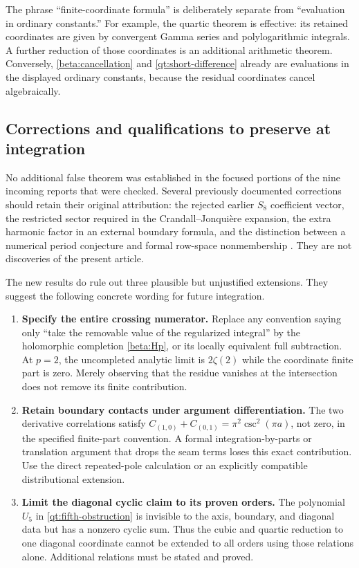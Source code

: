 The phrase ``finite-coordinate formula'' is deliberately separate from
``evaluation in ordinary constants.'' For example, the quartic theorem
is effective: its retained coordinates are given by convergent Gamma
series and polylogarithmic integrals. A further reduction of those
coordinates is an additional arithmetic theorem. Conversely,
\eqref{beta:cancellation} and \eqref{qt:short-difference} already are
evaluations in the displayed ordinary constants, because the residual
coordinates cancel algebraically.

\subsection{Corrections and qualifications to preserve at integration}

No additional false theorem was established in the focused portions of
the nine incoming reports that were checked. Several previously
documented corrections should retain their original attribution: the
rejected earlier $S_8$ coefficient vector, the restricted sector required
in the Crandall--Jonqui\`ere expansion, the extra harmonic factor in an
external boundary formula, and the distinction between a numerical
period conjecture and formal row-space nonmembership
\cite{RepoExact,RepoCubic,RepoIndependent}. They are not discoveries of
the present article.

The new results do rule out three plausible but unjustified extensions.
They suggest the following concrete wording for future integration.
\begin{enumerate}
\item \textbf{Specify the entire crossing numerator.}
Replace any convention saying only ``take the removable value of the
regularized integral'' by the holomorphic completion
\eqref{beta:Hp}, or its locally equivalent full subtraction. At $p=2$,
the uncompleted analytic limit is $2\zeta(2)$ while the coordinate
finite part is zero. Merely observing that the residue vanishes at the
intersection does not remove its finite contribution.
\item \textbf{Retain boundary contacts under argument differentiation.}
The two derivative correlations satisfy
$C_{(1,0)}+C_{(0,1)}=\pi^2\csc^2(\pi a)$, not zero, in the specified
finite-part convention. A formal integration-by-parts or translation
argument that drops the seam terms loses this exact contribution.
Use the direct repeated-pole calculation or an explicitly compatible
distributional extension.
\item \textbf{Limit the diagonal cyclic claim to its proven orders.}
The polynomial $U_5$ in \eqref{qt:fifth-obstruction} is invisible to the
axis, boundary, and diagonal data but has a nonzero cyclic sum. Thus the
cubic and quartic reduction to one diagonal coordinate cannot be
extended to all orders using those relations alone. Additional
relations must be stated and proved.
\end{enumerate}

